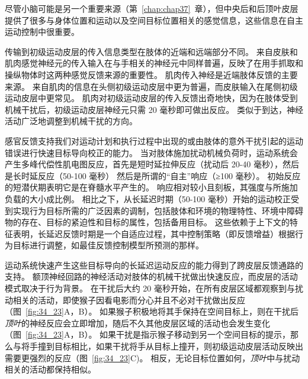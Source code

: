 尽管小脑可能是另一个重要来源（第~\ref{chap:chap37}~章），但中央后和后顶叶皮层提供了很多与身体位置和运动以及空间目标位置相关的感觉信息，这些信息在自主运动控制中很重要。


传输到初级运动皮层的传入信息类型在肢体的近端和远端部分不同。
来自皮肤和肌肉感觉神经元的传入输入在与手相关的神经元中同样普遍，反映了在用手抓取和操纵物体时这两种感觉反馈来源的重要性。
肌肉传入神经是近端肢体反馈的主要来源。
来自肌肉的信息在头侧初级运动皮层中更为普遍，而皮肤输入在尾侧初级运动皮层中更常见。
肌肉对初级运动皮层的传入反馈出奇地快，因为在肢体受到机械干扰后，初级运动皮层神经元只需 20 毫秒即可做出反应。
类似于到达，神经活动广泛地调整到机械干扰的方向。


感官反馈支持我们对运动计划和执行过程中出现的或由肢体的意外干扰引起的运动错误进行快速目标导向校正的能力。
当对肢体施加扰动机械负荷时，运动系统会产生多峰代偿性肌电图反应，首先是短时延拉伸反应（扰动后 20-40 毫秒），然后是长时延反应（50-100 毫秒） 然后是所谓的“自主”响应（≥100 毫秒）。
初始反应的短潜伏期表明它是在脊髓水平产生的。
响应相对较小且刻板，其强度与所施加负载的大小成比例。
相比之下，从长延迟时期（50-100 毫秒）开始的运动校正受到实现行为目标所需的广泛因素的调制，包括肢体和环境的物理特性、环境中障碍物的存在、目标的紧迫性和目标的属性，包括备用目标。
这些依赖于上下文的特征表明，长延迟反馈时期是一个自适应过程，其中控制策略（即反馈增益）根据行为目标进行调整，如最佳反馈控制模型所预测的那样。


运动系统快速产生这些目标导向的长延迟运动反应的能力得到了跨皮层反馈通路的支持。
额顶神经回路的神经活动对肢体的机械干扰做出快速反应，而皮层的活动模式取决于行为背景。
在干扰后大约 20 毫秒开始，在所有皮层区域都观察到与扰动相关的活动，即使猴子因看电影而分心并且不必对干扰做出反应（图~\ref{fig:34_23}A，B）。
如果猴子积极地将其手保持在空间目标上，则在干扰后\textit{顶叶}的神经反应会立即增加，随后不久其他皮层区域的活动也会发生变化（图~\ref{fig:34_23}A，B）。
如果干扰是指示猴子移动到另一个空间目标的提示，那么与将手撞到目标相比，如果干扰将手从目标上撞开，则初级运动皮层活动反映出需要更强烈的反应（图~\ref{fig:34_23}C)。
相反，无论目标位置如何，\textit{顶叶}中与扰动相关的活动都保持相似。


